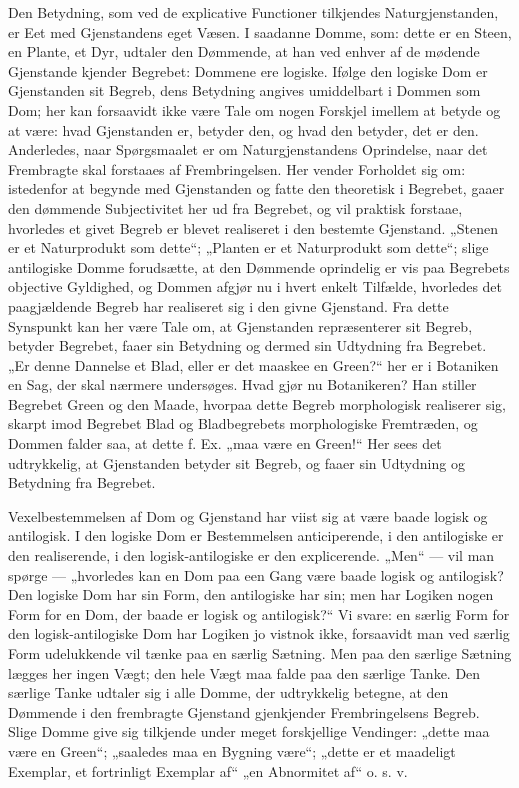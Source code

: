 \documentclass[12pt]{book}
\newcommand{\opage}[1]{\marginnote{\footnotesize\textit{[#1]}}}
\begin{document}
Den Betydning, som ved de explicative Functioner tilkjendes
Naturgjenstanden, er Eet med Gjenstandens eget
Væsen. I saadanne Domme, som: dette er en Steen, en
Plante, et Dyr, udtaler den Dømmende, at han ved enhver
af de mødende Gjenstande kjender Begrebet: Dommene ere
logiske. Ifølge den logiske Dom er Gjenstanden sit Begreb,
dens Betydning angives umiddelbart i Dommen som Dom;
her kan forsaavidt ikke være Tale om nogen Forskjel imellem
at betyde og at være: hvad Gjenstanden er, betyder den, og
hvad den betyder, det er den. Anderledes, naar Spørgsmaalet
er om Naturgjenstandens Oprindelse, naar det Frembragte skal
forstaaes af Frembringelsen. Her vender Forholdet sig om:
istedenfor at begynde med Gjenstanden og fatte den theoretisk
i Begrebet, gaaer den dømmende Subjectivitet her ud fra
Begrebet, og vil praktisk forstaae, hvorledes et givet Begreb
er blevet realiseret i den bestemte Gjenstand. „Stenen er et
\opage{145}Naturprodukt som dette“; „Planten er et Naturprodukt som
dette“; slige antilogiske Domme forudsætte, at den Dømmende
oprindelig er vis paa Begrebets objective Gyldighed, og
Dommen afgjør nu i hvert enkelt Tilfælde, hvorledes det
paagjældende Begreb har realiseret sig i den givne Gjenstand.
Fra dette Synspunkt kan her være Tale om, at Gjenstanden
repræsenterer sit Begreb, betyder Begrebet, faaer sin Betydning
og dermed sin Udtydning fra Begrebet. „Er denne Dannelse
et Blad, eller er det maaskee en Green?“ her er i Botaniken
en Sag, der skal nærmere undersøges. Hvad gjør nu Botanikeren?
Han stiller Begrebet Green og den Maade, hvorpaa
dette Begreb morphologisk realiserer sig, skarpt imod Begrebet
Blad og Bladbegrebets morphologiske Fremtræden, og
Dommen falder saa, at dette f. Ex. „maa være en Green!“
Her sees det udtrykkelig, at Gjenstanden betyder sit Begreb,
og faaer sin Udtydning og Betydning fra Begrebet.

Vexelbestemmelsen af Dom og Gjenstand har viist sig at
være baade logisk og antilogisk. I den logiske Dom er Bestemmelsen
anticiperende, i den antilogiske er den realiserende,
i den logisk-antilogiske er den explicerende. „Men“ --- vil
man spørge --- „hvorledes kan en Dom paa een Gang være
baade logisk og antilogisk? Den logiske Dom har sin Form,
den antilogiske har sin; men har Logiken nogen Form for en
Dom, der baade er logisk og antilogisk?“ Vi svare: en særlig
Form for den logisk-antilogiske Dom har Logiken jo vistnok
ikke, forsaavidt man ved særlig Form udelukkende vil
tænke paa en særlig Sætning. Men paa den særlige Sætning
lægges her ingen Vægt; den hele Vægt maa falde paa
den særlige Tanke. Den særlige Tanke udtaler sig i alle Domme,
der udtrykkelig betegne, at den Dømmende i den frembragte Gjenstand
gjenkjender Frembringelsens Begreb. Slige Domme give
sig tilkjende under meget forskjellige Vendinger: „dette maa
være en Green“; „saaledes maa en Bygning være“; „dette er et
\opage{146}maadeligt Exemplar, et fortrinligt Exemplar af“ „en Abnormitet
af“ o. s. v.
\end{document}

